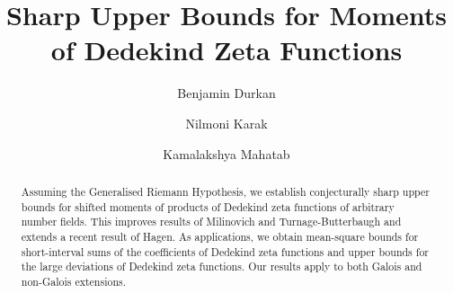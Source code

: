 \documentclass[twoside,reqno,11pt,a4paper]{amsart}
\numberwithin{equation}{section}
\theoremstyle{plain}
\theoremstyle{definition}
\theoremstyle{remark}
\begin{document}
\title[Moments of Dedekind Zeta Functions]{Sharp Upper Bounds for Moments of Dedekind Zeta Functions}
    \author{Benjamin Durkan}
\address{\scriptsize Benjamin Durkan, Department of Mathematics, The University of Manchester, Oxford Road, Manchester, M13 9PL}
	\author{Nilmoni Karak}
	\address{ \scriptsize Nilmoni Karak, Department of Mathematics,
		Indian Institute of Technology	Kharagpur,
		Kharagpur-721302, India}

	\author{Kamalakshya Mahatab}
	\address{ \scriptsize  Kamalakshya Mahatab, Department of Mathematics,
		Indian Institute of Technology	Kharagpur,
		Kharagpur-721302, India}
	


\begin{abstract}
	Assuming the Generalised Riemann Hypothesis, we establish conjecturally sharp upper bounds for shifted moments of products of Dedekind zeta functions of arbitrary number fields. This improves results of Milinovich and Turnage-Butterbaugh and extends a recent result of Hagen. As applications, we obtain mean-square bounds for short-interval sums of the coefficients of Dedekind zeta functions and upper bounds for the large deviations of Dedekind zeta functions. Our results apply to both Galois and non-Galois extensions.
\end{abstract}

	\maketitle
	 
\end{document}
